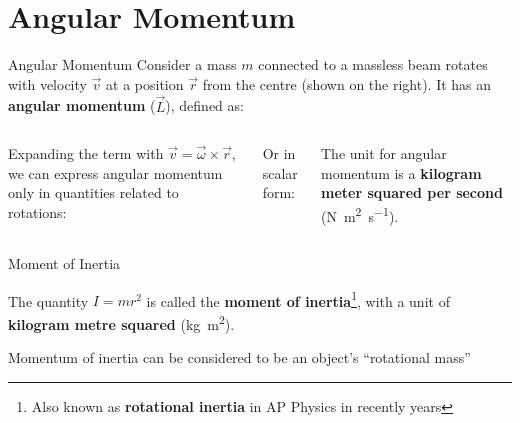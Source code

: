 \documentclass[12pt,compress,aspectratio=169]{beamer}
\begin{document}
\section{Angular Momentum}

\begin{frame}{Angular Momentum}
  Consider a mass $m$ connected to a massless beam rotates with velocity
  $\vec v$ at a position $\vec r$ from the centre (shown on the right). It has
  an \textbf{angular momentum} ($\vec L$), defined as:
  \begin{columns}
    

    \vspace{-.1in}Expanding the term with $\vec v=\vec\omega\times\vec r$, we
    can express angular momentum only in quantities related to rotations:

    
    \vspace{-.2in}Or in scalar form:
    

    \vspace{-.2in}The unit for angular momentum is a
    \textbf{kilogram meter squared per second}
    (\si{\newton\metre\squared\per\second}).
    
  \end{columns}
\end{frame}



\begin{frame}{Moment of Inertia}
    
    
  The quantity $I=mr^2$ is called the \textbf{moment of inertia}\footnote{Also
  known as \textbf{rotational inertia} in AP Physics in recently years}, with
  a unit of \textbf{kilogram metre squared} (\si{\kilo\gram\metre\squared}).


  \vspace{-.15in}Momentum of inertia can be considered to be an object's
  ``rotational mass''
  \vspace{.3in}
\end{frame}
\end{document}
